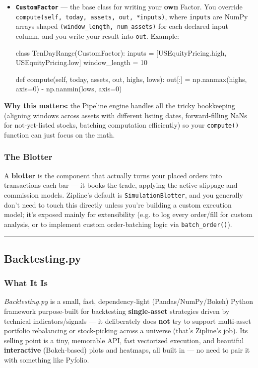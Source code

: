 \documentclass[12pt,openany]{book}
\theoremstyle{definition}
\theoremstyle{remark}
\begin{document}
\begin{itemize}
\begin{itemize}
\end{itemize}

\item 
\textbf{\texttt{CustomFactor}} — the base class for writing your \textbf{own} Factor. You override \texttt{compute(self, today, assets, out, *inputs)}, where \texttt{inputs} are NumPy arrays shaped \texttt{(window\_length, num\_assets)} for each declared input column, and you write your result into \texttt{out}. Example:

\begin{python}
class TenDayRange(CustomFactor):
    inputs = [USEquityPricing.high, USEquityPricing.low]
    window_length = 10

    def compute(self, today, assets, out, highs, lows):
        out[:] = np.nanmax(highs, axis=0) - np.nanmin(lows, axis=0)
\end{python}

\end{itemize}

\textbf{Why this matters:} the Pipeline engine handles all the tricky bookkeeping (aligning windows across assets with different listing dates, forward-filling NaNs for not-yet-listed stocks, batching computation efficiently) so your \texttt{compute()} function can just focus on the math.
\subsubsection{The Blotter}

A \textbf{blotter} is the component that actually turns your placed orders into transactions each bar — it books the trade, applying the active slippage and commission models. Zipline's default is \texttt{SimulationBlotter}, and you generally don't need to touch this directly unless you're building a custom execution model; it's exposed mainly for extensibility (e.g. to log every order/fill for custom analysis, or to implement custom order-batching logic via \texttt{batch\_order()}).

\medskip
\hrule
\medskip
\subsection{Backtesting.py}
\subsubsection{What It Is}

\emph{Backtesting.py} is a small, fast, dependency-light (Pandas/NumPy/Bokeh) Python framework purpose-built for backtesting \textbf{single-asset} strategies driven by technical indicators/signals — it deliberately does \textbf{not} try to support multi-asset portfolio rebalancing or stock-picking across a universe (that's Zipline's job). Its selling point is a tiny, memorable API, fast vectorized execution, and beautiful \textbf{interactive} (Bokeh-based) plots and heatmaps, all built in — no need to pair it with something like Pyfolio.
\end{document}

